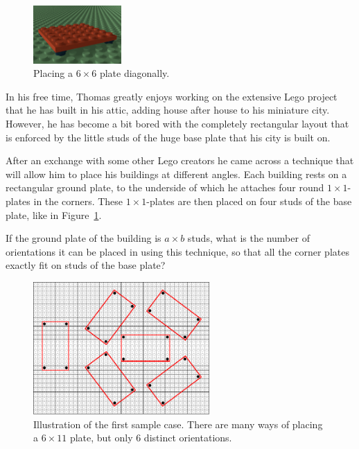 
\begin{figure}
  \vspace{-5mm}
  \includegraphics[width=0.3\textwidth]{rotated-plate.png}
  \caption{Placing a $6\times6$ plate diagonally.}
  \vspace{-5mm}
  \label{fig:rotated}
\end{figure}
In his free time, Thomas greatly enjoys working on the extensive Lego project
that he has built in his attic, adding house after house to his miniature city.
However, he has become a bit bored with the completely rectangular layout that
is enforced by the little studs of the huge base plate that his city is built
on.

After an exchange with some other Lego creators he came across a technique that
will allow him to place his buildings at different angles. Each building rests
on a rectangular ground plate, to the underside of which he attaches four round
$1\times 1$-plates in the corners. These $1\times 1$-plates are then placed on
four studs of the base plate, like in Figure~\ref{fig:rotated}.

If the ground plate of the building is $a\times b$ studs, what is the number of
orientations it can be placed in using this technique, so that all the corner
plates exactly fit on studs of the base plate?

\begin{figure}[!h]
  \centering
  \includegraphics[width=0.6\textwidth]{sample2}
  \caption{Illustration of the first sample case. There are many ways of
  placing a $6 \times 11$ plate, but only $6$ distinct orientations.}
\end{figure}

